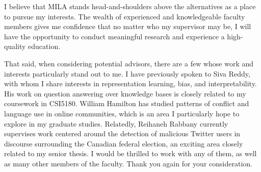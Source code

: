 I believe that MILA stands head-and-shoulders above the alternatives as a place to pursue my interests. The wealth of experienced and knowledgeable faculty members gives me confidence that no matter who my supervisor may be, I will have the opportunity to conduct meaningful research and experience a high-quality education.

That said, when considering potential advisors, there are a few whose work and interests particularly stand out to me. I have previously spoken to Siva Reddy, with whom I share interests in representation learning, bias, and interpretability. His work on question answering over knowledge bases is closely related to my coursework in CSI5180. William Hamilton has studied patterns of conflict and language use in online communities, which is an area I particularly hope to explore in my graduate studies. Relatedly, Reihaneh Rabbany currently supervises work centered around the detection of malicious Twitter users in discourse surrounding the Canadian federal election, an exciting area closely related to my senior thesis. I would be thrilled to work with any of them, as well as many other members of the faculty. Thank you again for your consideration.